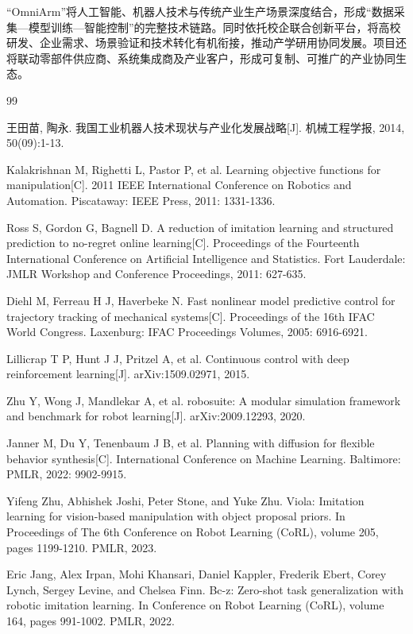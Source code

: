 \documentclass[zihao=-4]{ctexart}
\begin{document}
“OmniArm”将人工智能、机器人技术与传统产业生产场景深度结合，形成“数据采集—模型训练—智能控制”的完整技术链路。同时依托校企联合创新平台，将高校研发、企业需求、场景验证和技术转化有机衔接，推动产学研用协同发展。项目还将联动零部件供应商、系统集成商及产业客户，形成可复制、可推广的产业协同生态。

\newpage
{}

\begin{thebibliography}{99}

 王田苗, 陶永. 我国工业机器人技术现状与产业化发展战略[J]. 机械工程学报, 2014, 50(09):1-13.

 Kalakrishnan M, Righetti L, Pastor P, et al. Learning objective functions for manipulation[C]. 2011 IEEE International Conference on Robotics and Automation. Piscataway: IEEE Press, 2011: 1331-1336.

 Ross S, Gordon G, Bagnell D. A reduction of imitation learning and structured prediction to no-regret online learning[C]. Proceedings of the Fourteenth International Conference on Artificial Intelligence and Statistics. Fort Lauderdale: JMLR Workshop and Conference Proceedings, 2011: 627-635.

 Diehl M, Ferreau H J, Haverbeke N. Fast nonlinear model predictive control for trajectory tracking of mechanical systems[C]. Proceedings of the 16th IFAC World Congress. Laxenburg: IFAC Proceedings Volumes, 2005: 6916-6921.

 Lillicrap T P, Hunt J J, Pritzel A, et al. Continuous control with deep reinforcement learning[J]. arXiv:1509.02971, 2015.

 Zhu Y, Wong J, Mandlekar A, et al. robosuite: A modular simulation framework and benchmark for robot learning[J]. arXiv:2009.12293, 2020.

 Janner M, Du Y, Tenenbaum J B, et al. Planning with diffusion for flexible behavior synthesis[C]. International Conference on Machine Learning. Baltimore: PMLR, 2022: 9902-9915.

 Yifeng Zhu, Abhishek Joshi, Peter Stone, and Yuke Zhu. Viola: Imitation learning for vision-based manipulation with object proposal priors. In Proceedings of The 6th Conference on Robot Learning (CoRL), volume 205, pages 1199-1210. PMLR, 2023.

 Eric Jang, Alex Irpan, Mohi Khansari, Daniel Kappler, Frederik Ebert, Corey Lynch, Sergey Levine, and Chelsea Finn. Bc-z: Zero-shot task generalization with robotic imitation learning. In Conference on Robot Learning (CoRL), volume 164, pages 991-1002. PMLR, 2022.


\end{thebibliography}
\end{document}
